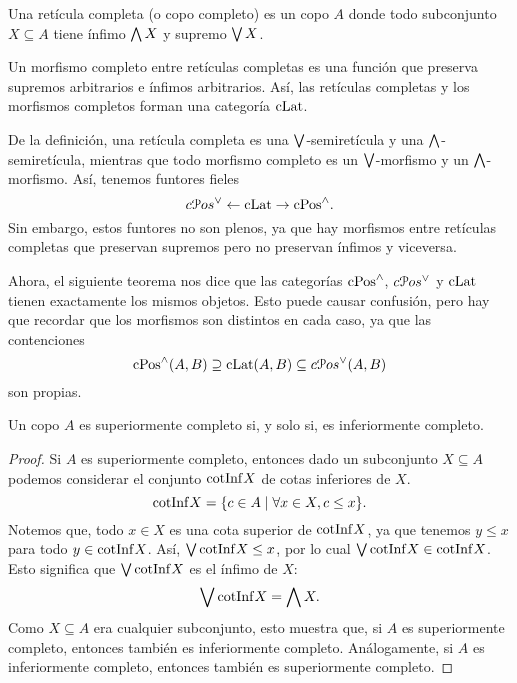 \begin{defn}
  Una retícula completa (o copo completo) es un copo $A$
  donde todo subconjunto $X\subseteq A$ tiene ínfimo $\bigwedge X$ y
  supremo $\bigvee X$.

  Un morfismo completo entre retículas completas es una función que
  preserva supremos arbitrarios e ínfimos arbitrarios.
  Así, las retículas completas y los morfismos completos forman una
  categoría $\mathrm{cLat}$.
\end{defn}
De la definición, una retícula completa es una
$\bigvee$-semiretícula y una $\bigwedge$-semiretícula, mientras que todo
morfismo completo es un $\bigvee$-morfismo y un $\bigwedge$-morfismo.
Así, tenemos funtores fieles
\begin{equation}
  c\EuScript{P}os^\vee \leftarrow \mathrm{cLat} \to \mathrm{cPos}^\wedge.
\end{equation}
Sin embargo, estos funtores no son plenos, ya que hay morfismos entre
retículas completas que preservan supremos pero no preservan ínfimos y
viceversa.

Ahora, el siguiente teorema nos dice que las categorías $\mathrm{cPos}^\wedge$,
$c\EuScript{P}os^\vee$ y $\mathrm{cLat}$ tienen exactamente los mismos objetos.
Esto puede causar confusión, pero hay que recordar que los morfismos
son distintos en cada caso, ya que las contenciones
\[
  \mathrm{cPos}^\wedge(A,B)\supseteq \mathrm{cLat}(A,B)\subseteq c\EuScript{P}os^\vee(A,B)
\]
son propias.
\begin{thm}
  Un copo $A$ es superiormente completo si, y solo si, es
  inferiormente completo.
\end{thm}
\begin{proof}
  Si $A$ es superiormente completo, entonces
  dado un subconjunto $X\subseteq A$ podemos considerar el conjunto
  $\mathrm{cotInf} X$ de cotas inferiores de $X$.
  \[
    \mathrm{cotInf} X = \{c\in A \mid \forall x\in X, c\leq x\}
  .\]
  Notemos que, todo $x\in X$ es una cota superior de $\mathrm{cotInf} X$,
  ya que tenemos $y\leq x$ para todo $y\in\mathrm{cotInf} X$.
  Así, $\bigvee\mathrm{cotInf} X\leq x$, por lo cual
  $\bigvee\mathrm{cotInf} X\in\mathrm{cotInf} X$.
  Esto significa que $\bigvee\mathrm{cotInf} X$ es el ínfimo de $X$:
  \[
    \bigvee\mathrm{cotInf} X = \bigwedge X
  .\]
  Como $X\subseteq A$ era cualquier subconjunto,
  esto muestra que, si $A$ es superiormente completo, entonces
  también es inferiormente completo.
  Análogamente, si $A$ es inferiormente completo, entonces también
  es superiormente completo.
\end{proof}



